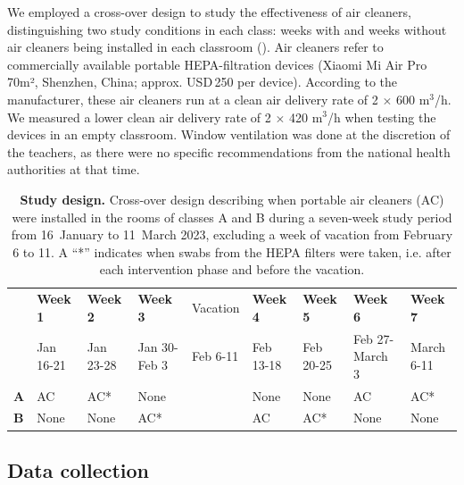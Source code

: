 \documentclass[fleqn,11pt]{wlscirep}
\begin{document}
\noindent We employed a cross-over design to study the effectiveness of air cleaners, distinguishing two study conditions in each class: weeks with and weeks without air cleaners being installed in each classroom (). Air cleaners refer to commercially available portable HEPA-filtration devices (Xiaomi Mi Air Pro 70m², Shenzhen, China; approx. USD\,250 per device). According to the manufacturer, these air cleaners run at a clean air delivery rate of 2$\,\times\,$600 m$^{3}$/h. We measured a lower clean air delivery rate of 2$\,\times\,$420 m$^{3}$/h when testing the devices in an empty classroom. Window ventilation was done at the discretion of the teachers, as there were no specific recommendations from the national health authorities at that time.

\begin{table}[!htpb]
    \footnotesize
    \centering
    \caption{\textbf{Study design.} Cross-over design describing when portable air cleaners (AC) were installed in the rooms of classes A and B during a seven-week study period from 16~January to 11~March 2023, excluding a week of vacation from February 6 to 11. A ``*'' indicates when swabs from the HEPA filters were taken, i.e. after each intervention phase and before the vacation.}\label{tab:study_design}
    \begin{tabular}{l l l l l l l l l}
    \toprule
      & \textbf{Week 1} & \textbf{Week 2} & \textbf{Week 3} & Vacation & \textbf{Week 4} & \textbf{Week 5} & \textbf{Week 6} & \textbf{Week 7} \\
      & Jan 16-21 & Jan 23-28 & Jan 30-Feb 3 & Feb 6-11 & Feb 13-18 & Feb 20-25 & Feb 27-March 3 & March 6-11 \\
      \midrule
      \textbf{A} & \cellcolor{gray!50} AC & \cellcolor{gray!50} AC\hphantom{0000}*& \cellcolor{gray!10} None & & \cellcolor{gray!10} None & \cellcolor{gray!10} None & \cellcolor{gray!50} AC & \cellcolor{gray!50} AC\hphantom{00009}* \\
      \textbf{B} & \cellcolor{gray!10} None & \cellcolor{gray!10} None & \cellcolor{gray!50} AC\hphantom{0000000}* & & \cellcolor{gray!50} AC & \cellcolor{gray!50} AC\hphantom{0000}*& \cellcolor{gray!10} None & \cellcolor{gray!10} None \\
      \bottomrule
    \end{tabular}
\end{table}
 
\subsection{Data collection}
\end{document}
